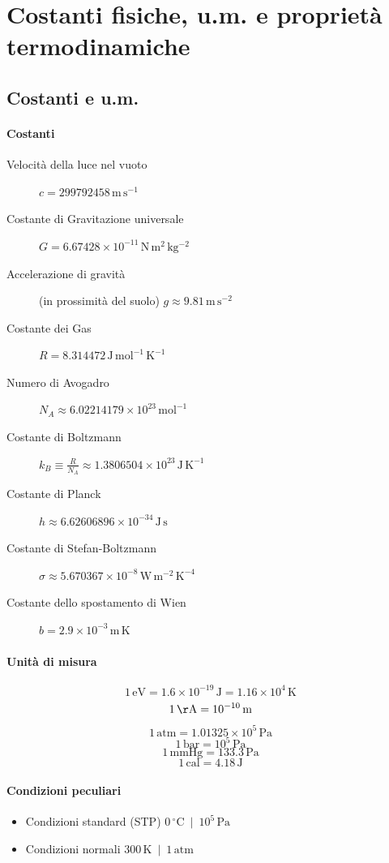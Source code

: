 \documentclass[10pt, oneside]{book}
\begin{document}
\section{Costanti fisiche, u.m. e proprietà termodinamiche}
\subsection*{Costanti e u.m.}
\paragraph{Costanti}
\begin{description}
\item[Velocità della luce nel vuoto] $\displaystyle c = 299792458 \, \mathrm{m \, s^{-1}}$
\item[Costante di Gravitazione universale] $\displaystyle G = 6.67428 \times 10^{-11} \, \mathrm{N \, m^2 \, kg^{-2}}$
\item[Accelerazione di gravità] (in prossimità del suolo) $\displaystyle g \approx 9.81 \, \mathrm{m \, s^{-2}}$
\item[Costante dei Gas] $\displaystyle R = 8.314472 \, \mathrm{J \, mol^{-1} \, K^{-1}}$
\item[Numero di Avogadro] $\displaystyle N_A \approx 6.02214179 \times 10^{23} \, \mathrm{mol^{-1}}$
\item[Costante di Boltzmann] $\displaystyle k_B \equiv \frac{R}{N_A} \approx 1.3806504 \times 10^{23} \, \mathrm{J \, K^{-1}}$ 
\item[Costante di Planck] $\displaystyle h \approx 6.62606896 \times 10^{-34} \, \mathrm{J \, s}$
\item[Costante di Stefan-Boltzmann] $\displaystyle \sigma \approx 5.670367 \times 10^{-8} \, \mathrm{W \, m^{-2} \, K^{-4}}$
\item[Costante dello spostamento di Wien] $\displaystyle b = 2.9 \times 10^{-3} \, \mathrm{m \, K}$
\end{description}
\paragraph{Unità di misura}
\[1 \, \mathrm{eV} = 1.6 \times 10^{-19} \, \mathrm{J} = 1.16 \times 10^{4} \, \mathrm{K}\]
\[1 \, \mathrm{\AA} = 10^{-10} \, \mathrm{m}\]
\[1 \, \mathrm{atm} = 1.01325 \times 10^{5} \, \mathrm{Pa}\]
\[1 \, \mathrm{bar} = 10^{5} \, \mathrm{Pa}\]
\[1 \, \mathrm{mmHg} = 133.3 \, \mathrm{Pa}\]
\[1 \, \mathrm{cal} = 4.18 \, \mathrm{J}\]

\paragraph{Condizioni peculiari}
\begin{itemize}
\item Condizioni standard (STP) \dotfill $ 0 \, \mathrm{{}^\circ C} \enspace \big| \enspace 10^5 \, \mathrm{Pa}$
\item Condizioni normali \dotfill $ 300 \, \mathrm{K} \enspace \big| \enspace 1 \, \mathrm{atm}$

\end{itemize}
\end{document}
